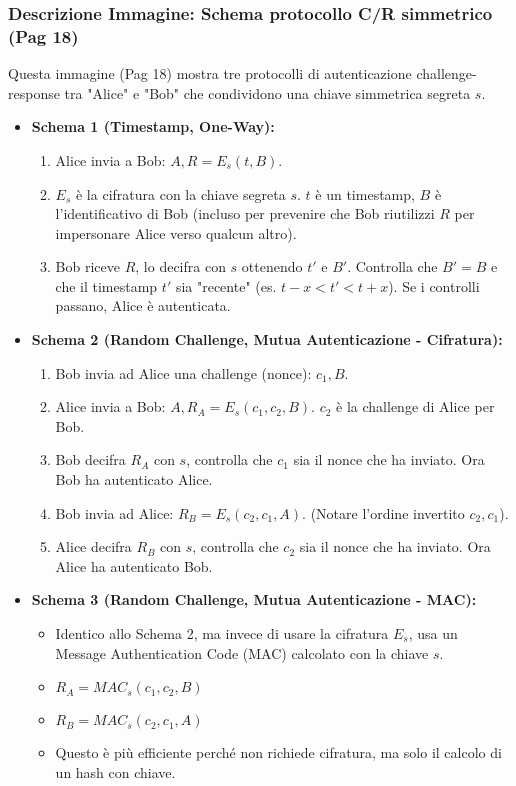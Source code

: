 \documentclass[../main.tex]{subfiles}
\begin{document}
\subsubsection*{Descrizione Immagine: Schema protocollo C/R simmetrico (Pag 18)}
Questa immagine (Pag 18) mostra tre protocolli di autenticazione challenge-response tra "Alice" e "Bob" che condividono una chiave simmetrica segreta $s$.
\begin{itemize}
    \item \textbf{Schema 1 (Timestamp, One-Way):}
          \begin{enumerate}
              \item Alice invia a Bob: $A, R = E_s(t, B)$.
              \item $E_s$ è la cifratura con la chiave segreta $s$. $t$ è un timestamp, $B$ è l'identificativo di Bob (incluso per prevenire che Bob riutilizzi $R$ per impersonare Alice verso qualcun altro).
              \item Bob riceve $R$, lo decifra con $s$ ottenendo $t'$ e $B'$. Controlla che $B' = B$ e che il timestamp $t'$ sia "recente" (es. $t-x < t' < t+x$). Se i controlli passano, Alice è autenticata.
          \end{enumerate}
    \item \textbf{Schema 2 (Random Challenge, Mutua Autenticazione - Cifratura):}
          \begin{enumerate}
              \item Bob invia ad Alice una challenge (nonce): $c_1, B$.
              \item Alice invia a Bob: $A, R_A = E_s(c_1, c_2, B)$. $c_2$ è la challenge di Alice per Bob.
              \item Bob decifra $R_A$ con $s$, controlla che $c_1$ sia il nonce che ha inviato. Ora Bob ha autenticato Alice.
              \item Bob invia ad Alice: $R_B = E_s(c_2, c_1, A)$. (Notare l'ordine invertito $c_2, c_1$).
              \item Alice decifra $R_B$ con $s$, controlla che $c_2$ sia il nonce che ha inviato. Ora Alice ha autenticato Bob.
          \end{enumerate}
    \item \textbf{Schema 3 (Random Challenge, Mutua Autenticazione - MAC):}
          \begin{itemize}
              \item Identico allo Schema 2, ma invece di usare la cifratura $E_s$, usa un Message Authentication Code (MAC) calcolato con la chiave $s$.
              \item $R_A = MAC_s(c_1, c_2, B)$
              \item $R_B = MAC_s(c_2, c_1, A)$
              \item Questo è più efficiente perché non richiede cifratura, ma solo il calcolo di un hash con chiave.
          \end{itemize}
\end{itemize}
\end{document}
